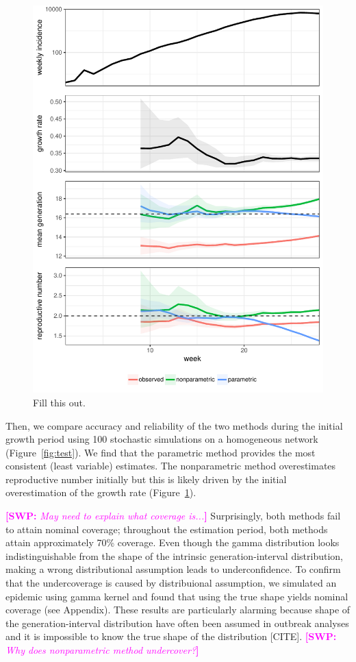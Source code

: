 \documentclass[12pt]{article}
\newcommand{\comment}[3]{\textcolor{#1}{\textbf{[#2: }\textsl{#3}\textbf{]}}}
\newcommand{\swp}[1]{\comment{magenta}{SWP}{#1}}
\begin{document}
\begin{figure}
\includegraphics[width=\textwidth]{../fig/example.pdf}
\caption{Fill this out.}
\label{fig:example}
\end{figure}

Then, we compare accuracy and reliability of the two methods during the initial growth period using 100 stochastic simulations on a homogeneous network (Figure~\ref{fig:test}).
We find that the parametric method provides the most consistent (least variable) estimates.
The nonparametric method overestimates reproductive number initially but this is likely driven by the initial overestimation of the growth rate (Figure~\ref{fig:example}).


\swp{May need to explain what coverage is...}
Surprisingly, both methods fail to attain nominal coverage;
throughout the estimation period, both methods attain approximately 70\% coverage.
Even though the gamma distribution looks indistinguishable from the shape of the intrinsic generation-interval distribution, making a wrong distributional assumption leads to underconfidence.
To confirm that the undercoverage is caused by distribuional assumption, we simulated an epidemic using gamma kernel and found that using the true shape yields nominal coverage (see Appendix).
These results are particularly alarming because shape of the generation-interval distribution have often been assumed in outbreak analyses and it is impossible to know the true shape of the distribution [CITE].
\swp{Why does nonparametric method undercover?}
\end{document}
